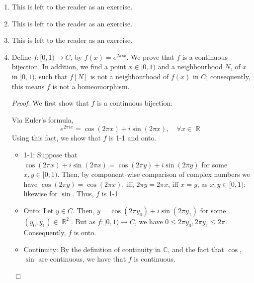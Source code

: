 \documentclass{book}
\DeclareMathOperator*{\R}{\mathbb{R}}
\DeclareMathOperator*{\E}{\mathbb{E}}
\begin{document}
\begin{enumerate}
\begin{proof}
\begin{itemize}
                \item $\E^2$: Fix $(x,y),(z,w) \in \R^2$. Then, the function, $f$ that sends $(a,b) \in \R^2$ to \[((x+z)-a, (y+w)-b)\]
                    sends  $(x,y)$ to $(z,w)$. As $f$ is linear, it is continuous. Likewise, its inverse is continuous. 

                \item Torus: Consider the torus as $S^1 \times S^1$. Then component wise examination shows that the example above proves the result. 
            \end{itemize}
        \end{proof}

    \item This is left to the reader as an exercise. 

    \item This is left to the reader as an exercise.

    \item This is left to the reader as an exercise.

    \item Define $f:[0,1) \rightarrow C$, by $f(x) = e^{2\pi i x}$. We prove that $f$ is a continuous bijection. In addition, we find a point $x \in [0,1)$ and a neighbourhood $N$, of $x$ in $[0,1)$, such that $f[N]$ is not a neighbourhood of $f(x)$ in $C$; consequently, this means $f$ is not a homeomorphism. 
        \begin{proof} We first show that $f$ is a continuous bijection: 
            \par Via Euler's formula,
            \[ e^{2\pi i x} = \cos(2\pi x) + i \sin(2\pi x), \quad \forall x \in \R \]
            Using this fact, we show that $f$ is 1-1 and onto. 
            \begin{itemize}
                \item 1-1: Suppose that $\cos(2\pi x) + i \sin(2\pi x) = \cos(2\pi y) + i \sin(2\pi y)$ for some $x, y \in [0,1)$. Then, by component-wise comparison of complex numbers we have $\cos(2\pi y) = \cos(2\pi x)$, iff, $2 \pi y = 2\pi x$, iff $x = y$, as $x,y \in [0,1)$; likewise for $\sin$. Thus, $f$ is 1-1. 

                \item Onto: Let $y \in C$. Then, $y = \cos(2\pi y_0) + i \sin(2\pi y_1)$ for some $(y_0, y_1) \in \R^2$. But as $f: [0,1) \rightarrow C$, we have $0 \leq 2 \pi y_0, 2\pi y_1 \leq 2\pi$. Consequently, $f$ is onto.

                \item Continuity: By the definition of continuity in $\mathbb{C}$, and the fact that $\cos$, $\sin$ are continuous, we have that $f$ is continuous. 
            \end{itemize}


\end{proof}
\end{enumerate}
\end{document}
